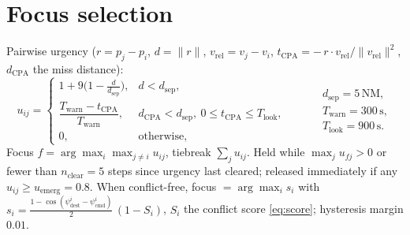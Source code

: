 \documentclass[11pt, a4paper]{article}
\begin{document}
\section{Focus selection}
Pairwise urgency ($r=p_j-p_i$, $d=\lVert r\rVert$, $v_\text{rel}=v_j-v_i$,
$t_\text{CPA}=-\,r\!\cdot\! v_\text{rel}/\lVert v_\text{rel}\rVert^2$, $d_\text{CPA}$ the miss distance):
\[
u_{ij}=
\begin{cases}
1+9\bigl(1-\tfrac{d}{d_\text{sep}}\bigr), & d<d_\text{sep},\\[1mm]
\dfrac{T_\text{warn}-t_\text{CPA}}{T_\text{warn}}, & d_\text{CPA}<d_\text{sep},\ 0\le t_\text{CPA}\le T_\text{look},\\[1mm]
0, & \text{otherwise,}
\end{cases}
\qquad
\begin{aligned}
&d_\text{sep}=5\,\text{NM},\\
&T_\text{warn}=300\,\text{s},\\
&T_\text{look}=900\,\text{s}.
\end{aligned}
\]
Focus $f=\arg\max_i\max_{j\ne i}u_{ij}$, tiebreak $\sum_{j}u_{ij}$. Held while
$\max_j u_{fj}>0$ or fewer than $n_\text{clear}=5$ steps since urgency last cleared;
released immediately if any $u_{ij}\ge u_\text{emerg}=0.8$.
When conflict-free, focus $=\arg\max_i s_i$ with
$s_i=\tfrac{1-\cos(\psi^i_\text{dest}-\psi^i_\text{cmd})}{2}\,(1-S_i)$,
$S_i$ the conflict score \eqref{eq:score}; hysteresis margin $0.01$.

\end{document}
